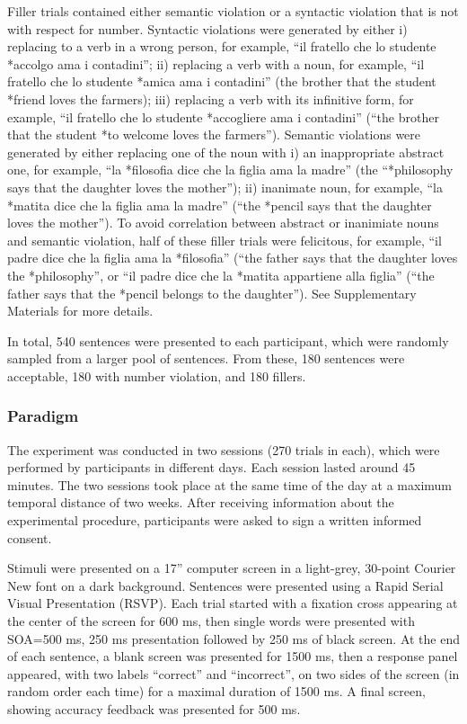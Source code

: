 Filler trials contained either semantic violation or a syntactic violation that is not with respect for number. Syntactic violations were generated by either i) replacing to a verb in a wrong person, for example, ``il fratello che lo studente *accolgo ama i contadini''; ii) replacing a verb with a noun, for example, ``il fratello che lo studente *amica ama i contadini'' (the brother that the student *friend loves the farmers); iii) replacing a verb with its infinitive form, for example, ``il fratello che lo studente *accogliere ama i contadini'' (``the brother that the student *to welcome loves the farmers''). Semantic violations were generated by either replacing one of the noun with i) an inappropriate abstract one, for example, ``la *filosofia dice che la figlia ama la madre'' (the ``*philosophy says that the daughter loves the mother''); ii) inanimate noun, for example, ``la *matita dice che la figlia ama la madre'' (``the *pencil says that the daughter loves the mother''). To avoid correlation between abstract or inanimiate nouns and semantic violation, half of these filler trials were felicitous, for example, ``il padre dice che la figlia ama la *filosofia'' (``the father says that the daughter loves the *philosophy'', or ``il padre dice che la *matita appartiene alla figlia'' (``the father says that the *pencil belongs to the daughter''). See Supplementary Materials for more details.

In total, 540 sentences were presented to each participant, which were randomly sampled from a larger pool of sentences. From these, 180 sentences were acceptable, 180 with number violation, and 180 fillers. 

\subsubsection{Paradigm}
The experiment was conducted in two sessions (270 trials in each), which were performed by participants in different days. Each session lasted around 45 minutes. The two sessions took place at the same time of the day at a maximum temporal distance of two weeks. After receiving information about the experimental procedure, participants were asked to sign a written informed consent. 

Stimuli were presented on a 17” computer screen in a light-grey, 30-point Courier New font on a dark background. Sentences were presented using a Rapid Serial Visual Presentation (RSVP). Each trial started with a fixation cross appearing at the center of the screen for 600 ms, then single words were presented with SOA=500 ms, 250 ms presentation followed by 250 ms of black screen. At the end of each sentence, a blank screen was presented for 1500 ms, then a response panel appeared, with two labels “correct” and “incorrect”, on two sides of the screen (in random order each time) for a maximal duration of 1500 ms. A final screen, showing accuracy feedback was presented for 500 ms.

